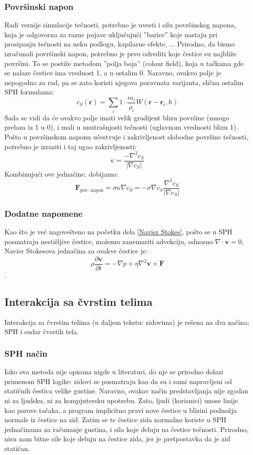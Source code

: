 \documentclass[12pt]{article}
\renewcommand{\vec}[1]{\mathbf{#1}}
\begin{document}
        \subsubsection{Povr\v sinski napon}
            Radi vernije simulacije te\v cnosti, potrebno je uvesti i silu povr\v sinskog napona, koja je odgovorna za razne pojave uklju\v cuju\'ci ''barice'' koje nastaju pri prosipanju te\v cnosti na neku podlogu, kapilarne efekte, ... Prirodno, da bismo izra\v cunali povr\v sinski napon, potrebno je prvo odrediti koje \v cestice su najbli\v ze povr\v sini. To se posti\v ze metodom ''polja boja'' (colour field), koja u ta\v ckama gde se nalaze \v cestice ima vrednost 1, a u ostalim 0. Naravno, ovakvo polje je nepogodno za rad, pa se zato koristi njegova poravnata varijanta, sli\v cna ostalim SPH formulama:
            $$c_S(\vec{r}) = \sum_i 1\cdot\frac{m_i}{\rho_i}W(\vec{r}-\vec{r}_i, h)$$
            Sada se vidi da \'ce ovakvo polje imati velik gradijent blizu povr\v sine (mnogo prelaza iz 1 u 0), i mali u unutra\v snjosti te\v cnosti (uglavnom vrednosti blizu 1). Po\v sto u povr\v sinskom naponu u\v cestvuje i zakrivljenost slobodne povr\v sine te\v cnosti, potrebno je izraziti i taj ugao zakrivljenosti:
            $$\kappa = \frac{-\nabla^2c_S}{|\nabla c_S|}$$
            Kombinuju\'ci ove jedna\v cine, dobijamo:
            $$\vec{F}_{\text{pov. napon}} = \sigma\kappa\nabla c_S = -\sigma \nabla c_S \frac{\nabla^2 c_S}{|\nabla c_S|}$$
        \subsubsection{Dodatne napomene}
            Kao \v sto je ve\'c nagove\v steno na po\v cetku dela \ref{Navier Stokes}, po\v sto se u SPH posmatraju nesti\v sljive \v cestice, mo\v zemo zanemariti advekciju, odnosno $\nabla \cdot \vec{v}=0$, Navier Stokesova jedna\v cina za ovakve \v cestice je:
            $$\rho \frac{\partial \vec{v}}{\partial t} = -\nabla p +\eta \nabla^2\vec{v}+\vec{F}$$.
    \subsection{Interakcija sa \v cvrstim telima}
        Interakcija sa \v cvrstim telima (u daljem tekstu: zidovima) je re\v sena na dva na\v cina: SPH i sudar \v cvrstih tela.
        \subsubsection{SPH na\v cin}
            Iako ova metoda nije opisana nigde u literaturi, do nje se prirodno dolazi primenom SPH logike: zidovi se posmatraju kao da su i sami napravljeni od stati\v cnih \v cestica velike gustine. Naravno, ovakav na\v cin predstavljanja nije zgodan ni za ljudsku, ni za kompjutersku upotrebu. Zato, ljudi (korisnici) unose linije kao parove ta\v caka, a program implicitno pravi nove \v cestice u blizini podno\v zja normale iz \v cestice na zid. Zatim se te \v cestice zida normalno koriste u SPH jedna\v cinama za ra\v cunanje gustina, i sila koje deluju na \v cestice te\v cnosti. Prirodno, nisu nam bitne sile koje deluju na \v cestice zida, jer je pretpostavka da je zid stati\v can.
\end{document}
